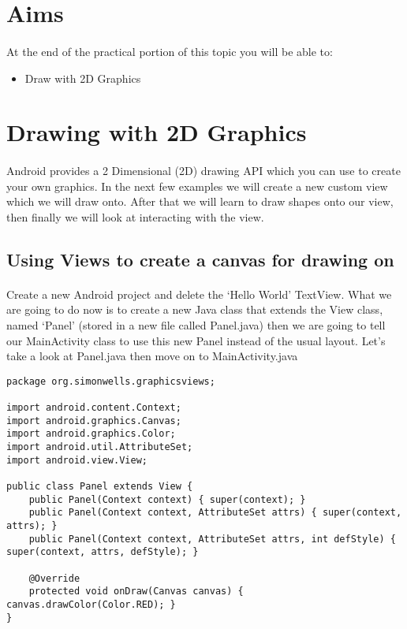 \section{Aims}
\paragraph{} At the end of the practical portion of this topic you will be able to:

\begin{itemize}
\item Draw with 2D Graphics
\end{itemize}

\section{Drawing with 2D Graphics}
\paragraph{} Android provides a 2 Dimensional (2D) drawing API which you can use to create your own graphics. In the next few examples we will create a new custom view which we will draw onto. After that we will learn to draw shapes onto our view, then finally we will look at interacting with the view.

\subsection{Using Views to create a canvas for drawing on}
\paragraph{} Create a new Android project and delete the `Hello World' TextView. What we are going to do now is to create a new Java class that extends the View class, named `Panel' (stored in a new file called Panel.java) then we are going to tell our MainActivity class to use this new Panel instead of the usual layout. Let's take a look at Panel.java then move on to MainActivity.java

\begin{lstlisting}
package org.simonwells.graphicsviews;

import android.content.Context;
import android.graphics.Canvas;
import android.graphics.Color;
import android.util.AttributeSet;
import android.view.View;

public class Panel extends View {
    public Panel(Context context) { super(context); }
    public Panel(Context context, AttributeSet attrs) { super(context, attrs); }
    public Panel(Context context, AttributeSet attrs, int defStyle) { super(context, attrs, defStyle); }

    @Override
    protected void onDraw(Canvas canvas) { canvas.drawColor(Color.RED); }
}
\end{lstlisting}

